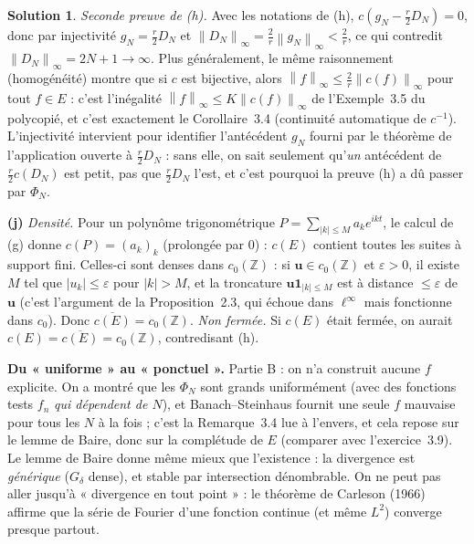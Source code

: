 \documentclass[11pt,a4paper]{article}
\newcommand{\Z}{\mathbb{Z}}
\newcommand{\adh}[1]{\overline{#1}}
\newcommand{\norm}[1]{\left\|#1\right\|}
\theoremstyle{definition}
\newtheorem*{solution}{Solution}
\begin{document}
\begin{solution}
\emph{Seconde preuve de (h).} Avec les notations de (h), $c(g_N-\frac r2D_N)=0$, donc par injectivité $g_N=\frac r2D_N$ et $\norm{D_N}_\infty=\frac2r\norm{g_N}_\infty<\frac2r$, ce qui contredit $\norm{D_N}_\infty=2N+1\to\infty$. Plus généralement, le même raisonnement (homogénéité) montre que si $c$ est bijective, alors $\norm f_\infty\le\frac2r\norm{c(f)}_\infty$ pour tout $f\in E$ : c'est l'inégalité $\norm f_\infty\le K\norm{c(f)}_\infty$ de l'Exemple~3.5 du polycopié, et c'est exactement le Corollaire~3.4 (continuité automatique de $c^{-1}$). L'injectivité intervient pour identifier l'antécédent $g_N$ fourni par le théorème de l'application ouverte à $\frac r2D_N$ : sans elle, on sait seulement qu'\emph{un} antécédent de $\frac r2c(D_N)$ est petit, pas que $\frac r2D_N$ l'est, et c'est pourquoi la preuve (h) a dû passer par $\Phi_N$.

\medskip
\noindent\textbf{(j)} \emph{Densité.} Pour un polynôme trigonométrique $P=\sum_{|k|\le M}a_ke^{ikt}$, le calcul de (g) donne $c(P)=(a_k)_k$ (prolongée par $0$) : $c(E)$ contient toutes les suites à support fini. Celles-ci sont denses dans $c_0(\Z)$ : si $\mathbf u\in c_0(\Z)$ et $\varepsilon>0$, il existe $M$ tel que $|u_k|\le\varepsilon$ pour $|k|>M$, et la troncature $\mathbf u\mathbf 1_{|k|\le M}$ est à distance $\le\varepsilon$ de $\mathbf u$ (c'est l'argument de la Proposition~2.3, qui échoue dans $\ell^\infty$ mais fonctionne dans $c_0$). Donc $\adh{c(E)}=c_0(\Z)$.
\emph{Non fermée.} Si $c(E)$ était fermée, on aurait $c(E)=\adh{c(E)}=c_0(\Z)$, contredisant (h).
\end{solution}

\begin{pointcle}
\textbf{Du « uniforme » au « ponctuel ».} Partie B : on n'a construit aucune $f$ explicite. On a montré que les $\Phi_N$ sont grands uniformément (avec des fonctions tests $f_n$ \emph{qui dépendent de $N$}), et Banach--Steinhaus fournit une seule $f$ mauvaise pour tous les $N$ à la fois ; c'est la Remarque~3.4 lue à l'envers, et cela repose sur le lemme de Baire, donc sur la complétude de $E$ (comparer avec l'exercice~3.9). Le lemme de Baire donne même mieux que l'existence : la divergence est \emph{générique} ($G_\delta$ dense), et stable par intersection dénombrable. On ne peut pas aller jusqu'à « divergence en tout point » : le théorème de Carleson (1966) affirme que la série de Fourier d'une fonction continue (et même $L^2$) converge presque partout.
\end{pointcle}
\end{document}
